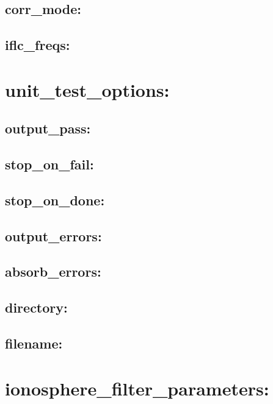 \subsection{corr\_mode:}

\subsection{iflc\_freqs:}





\section{unit\_test\_options:}

\subsection{output\_pass:}

\subsection{stop\_on\_fail:}

\subsection{stop\_on\_done:}

\subsection{output\_errors:}

\subsection{absorb\_errors:}

\subsection{directory:}

\subsection{filename:}






\section{ionosphere\_filter\_parameters:}

